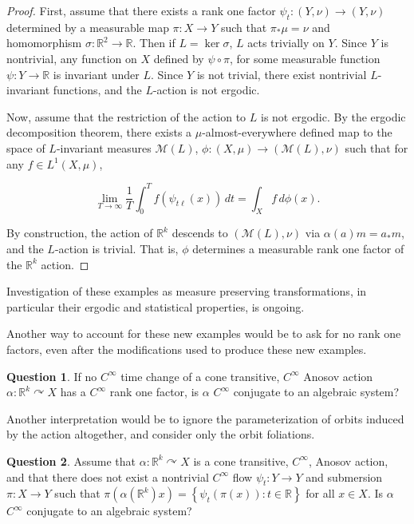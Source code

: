 \documentclass[12pt]{amsart}
\theoremstyle{definition}
\newtheorem{question}{Question}
\theoremstyle{remark}
\numberwithin{equation}{section}
\newcommand{\R}{\mathbb{R}}
\newcommand{\mc}{\mathcal}
\newcommand{\set}[1]{\left\lbrace #1 \right\rbrace}
\newcommand{\of}{\circ}
\newtheorem{Structural Stability Theorem}[theorem]{Structural Stability Theorem}
\begin{document}
\begin{proof}
First, assume that there exists a rank one factor $\psi_t : (Y,\nu) \to (Y,\nu)$ determined by a measurable map $\pi : X \to Y$ such that $\pi_*\mu = \nu$ and homomorphism $\sigma : \R^2 \to \R$. Then if $L = \ker \sigma$, $L$ acts trivially on $Y$. Since $Y$ is nontrivial, any function on $X$ defined by $\psi \of \pi$, for some measurable function $\psi : Y \to \R$ is invariant under $L$. Since $Y$ is not trivial, there exist nontrivial $L$-invariant functions, and the $L$-action is not ergodic.

Now, assume that the restriction of the action to $L$ is  not ergodic. By the ergodic decomposition theorem, there exists a $\mu$-almost-everywhere defined map to the space of $L$-invariant measures $\mc M(L)$, $\phi : (X,\mu) \to (\mc M(L),\nu)$ such that for any $f \in L^1(X,\mu)$,

\[ \lim_{T\to \infty} \dfrac{1}{T} \int_0^T f(\psi_{t\ell}(x)) \, dt = \int_X f \, d\phi(x). \]

By construction, the action of $\R^k$ descends to $(\mc M(L),\nu)$ via $\alpha(a)m = a_*m$, and the $L$-action is trivial. That is, $\phi$ determines a measurable rank one factor of the $\R^k$ action.
\end{proof}

Investigation of these examples as measure preserving transformations, in particular their ergodic and statistical properties, is ongoing.

Another way to account for these new examples would be to ask for no rank one factors, even after the modifications used to produce these new examples.

\begin{question}
If no $C^\infty$ time change of a cone transitive, $C^\infty$ Anosov action $\alpha : \R^k \curvearrowright X$ has a $C^\infty$ rank one factor, is $\alpha$ $C^\infty$ conjugate to an algebraic system?
\end{question}

Another interpretation would be to ignore the parameterization of orbits induced by the action altogether, and consider only the orbit foliations.

\begin{question}
Assume that $\alpha : \R^k \curvearrowright X$ is a cone transitive, $C^\infty$, Anosov action, and that there does not exist a nontrivial $C^\infty$ flow $\psi_t : Y \to Y$ and submersion $\pi : X \to Y$ such that $\pi(\alpha(\R^k)x) = \set{\psi_t(\pi(x)) : t \in \R}$ for all $x \in X$. Is $\alpha$ $C^\infty$ conjugate to an algebraic system?
\end{question}
\end{document}
